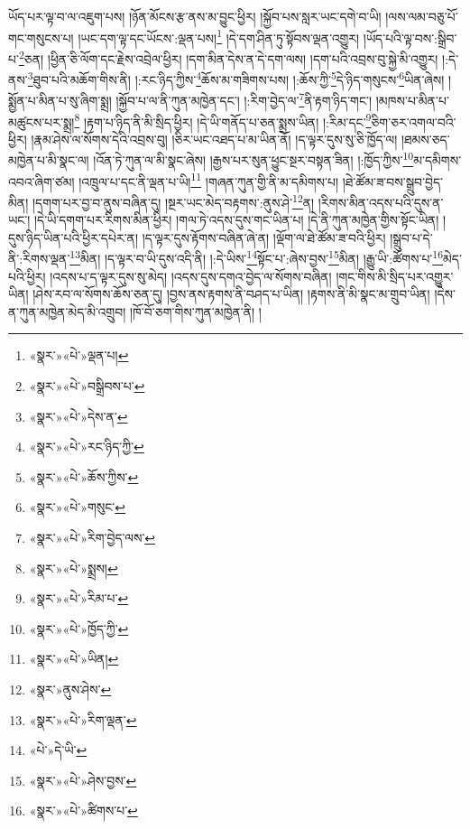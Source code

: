 ཡོད་པར་ལྟ་བ་ལ་འཇུག་པས། །ཉོན་མོངས་རྩ་ནས་མ་བྱུང་ཕྱིར། །སྐྱོབ་པས་སླར་ཡང་དགེ་བ་ཡི། །ལས་ལམ་བཅུ་པོ་གང་གསུངས་པ། །ཡང་དག་ལྟ་དང་ཡོངས་:ལྡན་པས།\footnote{«སྣར་»«པེ་»ལྡན་པ།} །དེ་དག་ཤིན་ཏུ་སྟོབས་ལྡན་འགྱུར། །ཡོད་པའི་ལྟ་བས་:སྒྲིབ་པ་\footnote{«སྣར་»«པེ་»བསྒྲིབས་པ་}ཅན། །ཕྱིན་ཅི་ལོག་དང་རྗེས་འབྲེལ་ཕྱིར། །དག་མིན་དེས་ན་དེ་དག་ལས། །དག་པའི་འབྲས་བུ་སྐྱེ་མི་འགྱུར། །:དེ་ནས་\footnote{«སྣར་»«པེ་»དེས་ན་}ཐུབ་པའི་མཆོག་གིས་ནི། །:རང་ཉིད་ཀྱིས་\footnote{«སྣར་»«པེ་»རང་ཉིད་ཀྱི་}ཆོས་མ་གཟིགས་པས། །:ཆོས་ཀྱི་\footnote{«སྣར་»«པེ་»ཆོས་ཀྱིས་}དེ་ཉིད་གསུངས་\footnote{«སྣར་»«པེ་»གསུང་}ཡིན་ཞེས། །སྨྱོན་པ་མིན་པ་སུ་ཞིག་སྨྲ། །སྐྱོབ་པ་ལ་ནི་ཀུན་མཁྱེན་དང་། །:རིག་བྱེད་ལ་\footnote{«སྣར་»«པེ་»རིག་བྱེད་ལས་}ནི་རྟག་ཉིད་གང་། །མཁས་པ་མིན་པ་མཚུངས་པར་སྨྲ།\footnote{«སྣར་»«པེ་»སྨྲས།} །རྟག་པ་ཉིད་ནི་མི་སྲིད་ཕྱིར། །དེ་ཡི་གནོད་པ་ཅན་སྨྲས་ཡིན། །:རིམ་དང་\footnote{«སྣར་»«པེ་»རིམ་པ་}ཅིག་ཅར་འགལ་བའི་ཕྱིར། །རྣམ་ཤེས་ལ་སོགས་དེའི་འབྲས་བུ། །ཅིར་ཡང་འཐད་པ་མ་ཡིན་ནོ། །ད་ལྟར་དུས་སུ་ཅི་ཁྱོད་ལ། །ཐམས་ཅད་མཁྱེན་པ་མི་སྣང་ལ། །འོན་ཏེ་ཀུན་ལ་མི་སྣང་ཞེས། །རྒྱས་པར་སུན་ཕྱུང་སྔར་བསྟན་ཟིན། །:ཁྱོད་ཀྱིས་\footnote{«སྣར་»«པེ་»ཁྱོད་ཀྱི་}མ་དམིགས་འབའ་ཞིག་ཙམ། །འཁྲུལ་པ་དང་ནི་ལྡན་པ་ཡི།\footnote{«སྣར་»«པེ་»ཡིན།} །གཞན་ཀུན་གྱི་ནི་མ་དམིགས་པ། །ཐེ་ཚོམ་ཟ་བས་སྒྲུབ་བྱེད་མིན། །དགག་པར་བྱ་བ་ནུས་བཞིན་དུ། །སྔར་ཡང་མེད་བརྟགས་:ནུས་ཤེ་\footnote{«སྣར་»ནུས་ཤེས་}ན། །རིགས་མིན་འདས་པའི་དུས་ན་ཡང་། །དེ་ཡི་དགག་པར་རིགས་མིན་ཕྱིར། །གལ་ཏེ་འདས་དུས་གང་ཡིན་པ། །དེ་ནི་ཀུན་མཁྱེན་གྱིས་སྟོང་ཡིན། །དུས་ཉིད་ཡིན་པའི་ཕྱིར་དཔེར་ན། །ད་ལྟར་དུས་རྟོགས་བཞིན་ཞེ་ན། །ལྡོག་ལ་ཐེ་ཚོམ་ཟ་བའི་ཕྱིར། །སྒྲུབ་པ་དེ་ནི་:རིགས་ལྡན་\footnote{«སྣར་»«པེ་»རིག་ལྡན་}མིན། །ད་ལྟར་བ་ཡི་དུས་འདི་ནི། །:དེ་ཡིས་\footnote{«པེ་»དེ་ཡི་}སྟོང་པ་:ཞེས་བྱས་\footnote{«སྣར་»«པེ་»ཤེས་བྱས་}མིན། །རྒྱུ་ཡི་:ཚོགས་པ་\footnote{«སྣར་»«པེ་»ཚིགས་པ་}མེད་པའི་ཕྱིར། །འདས་པ་ད་ལྟར་དུས་སུ་མེད། །འདས་དུས་དགའ་བྱེད་ལ་སོགས་བཞིན། །གང་གིས་མི་སྲིད་པར་འགྱུར་ཡིན། །ཤེས་རབ་ལ་སོགས་ཆོས་ཅན་དུ། །བྱས་ནས་རྟགས་ནི་བཤད་པ་ཡིན། །རྟགས་ནི་མི་སྣང་མ་གྲུབ་ཡིན། །དེས་ན་ཀུན་མཁྱེན་མེད་མི་འགྲུབ། །ཁོ་བོ་ཅག་གིས་ཀུན་མཁྱེན་ནི། །
